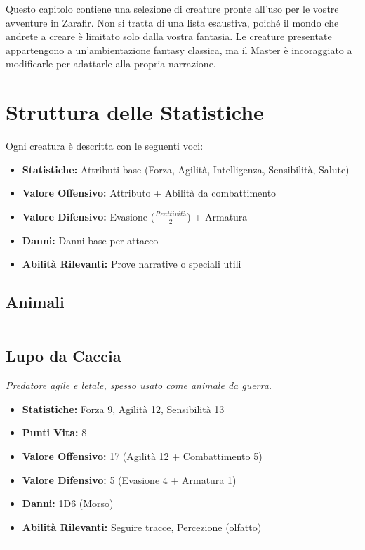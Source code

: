 \documentclass[../manuale_main.tex]{subfiles}
\begin{document}
Questo capitolo contiene una selezione di creature pronte all'uso per le vostre avventure in Zarafir. Non si tratta di una lista esaustiva, poiché il mondo che andrete a creare è limitato solo dalla vostra fantasia. Le creature presentate appartengono a un'ambientazione fantasy classica, ma il Master è incoraggiato a modificarle per adattarle alla propria narrazione.

\section{Struttura delle Statistiche}
Ogni creatura è descritta con le seguenti voci:
\begin{itemize}
\item \textbf{Statistiche:} Attributi base (Forza, Agilità, Intelligenza, Sensibilità, Salute)
\item \textbf{Valore Offensivo:} Attributo + Abilità da combattimento
\item \textbf{Valore Difensivo:} Evasione (\(\frac{\textit{Reattività}}{2}\)) + Armatura
\item \textbf{Danni:} Danni base per attacco
\item \textbf{Abilità Rilevanti:} Prove narrative o speciali utili
\end{itemize}

\subsection*{Animali}

\vspace{0.2cm}
\noindent
\begin{center}
\rule{\textwidth}{0.4pt} 
\end{center}

\subsection*{Lupo da Caccia}


\textit{Predatore agile e letale, spesso usato come animale da guerra.}
\begin{itemize}
\item \textbf{Statistiche:} Forza 9, Agilità 12, Sensibilità 13
\item \textbf{Punti Vita:} 8
\item \textbf{Valore Offensivo:} 17 (Agilità 12 + Combattimento 5)
\item \textbf{Valore Difensivo:} 5 (Evasione 4 + Armatura 1)
\item \textbf{Danni:} 1D6 (Morso)
\item \textbf{Abilità Rilevanti:} Seguire tracce, Percezione (olfatto)
\end{itemize}
\vspace{0.2cm}
\noindent
\begin{center}
\rule{\textwidth}{0.4pt} 
\end{center}
\end{document}
